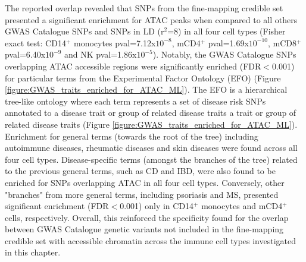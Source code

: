 The reported overlap revealed that SNPs from the fine-mapping credible set presented a significant enrichment for ATAC peaks  when compared to all others GWAS Catalogue SNPs and SNPs in LD (r$^2$=8) in all four cell types (Fisher exact test: CD14$^+$ monocytes pval=7.12x$10^{-8}$, mCD4$^+$ pval=1.69x$10^{-10}$, mCD8$^+$ pval=6.40x$10^{-9}$ and NK pval=1.86x$10^{-5}$). Notably, the GWAS Catalogue SNPs overlapping ATAC accessible regions were significantly enriched (FDR$<$0.001) for particular terms from the Experimental Factor Ontology (EFO) (Figure \ref{figure:GWAS_traits_enriched_for_ATAC_ML}). The EFO is a hierarchical tree-like ontology where each term represents a set of disease risk SNPs annotated to a disease trait or group of related disease traits a trait or group of related disease traits (Figure \ref{figure:GWAS_traits_enriched_for_ATAC_ML}). Enrichment for general terms (towards the root of the tree) including autoimmune diseases, rheumatic diseases and skin diseases were found across all four cell types. Disease-specific terms (amongst the branches of the tree) related to the previous general terms, such as CD and IBD, were also found to be enriched for SNPs overlapping ATAC in all four cell types. Conversely, other "branches" from more general terms, including psoriasis and MS, presented significant enrichment (FDR$<$0.001) only in CD14$^+$ monocytes and mCD4$^+$ cells, respectively. Overall, this reinforced the specificity found for the overlap between GWAS Catalogue genetic variants not included in the fine-mapping credible set with accessible chromatin across the immune cell types investigated in this chapter.



